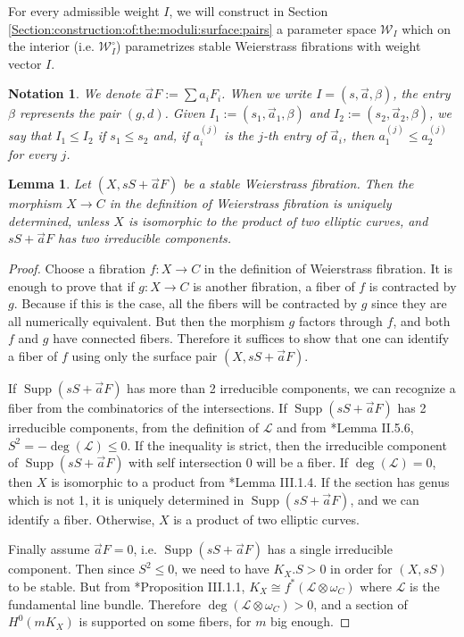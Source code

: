 \documentclass[11pt]{amsart}
\newcommand{\cE}{\mathcal{W}}
\newcommand{\sL}{\mathscr{L}}
\newtheorem{Lemma}[theorem]{Lemma}
\newtheorem{Notation}[theorem]{Notation}
\theoremstyle{definition}
\begin{document}
For every admissible weight $I$, we will construct in Section \ref{Section:construction:of:the:moduli:surface:pairs} a parameter space $\cE_I$ which on the interior (i.e. $\cE_I^\circ$) parametrizes stable Weierstrass fibrations with weight vector $I$.
\begin{Notation}
 We denote $\vec{a}F:=\sum a_i F_i$. When we write $I=(s, \vec{a},\beta)$, the entry $\beta$ represents the pair $(g,d)$. Given $I_1:=(s_1,\vec{a}_1,\beta)$ and $I_2:=(s_2,\vec{a}_2,\beta)$, we say that $I_1 \le I_2$ if $s_1 \le s_2$ and, if $a_i^{(j)}$ is the $j$-th entry of $\vec{a}_i$, then $a_1^{(j)} \le a_2^{(j)}$ for every $j$.
\end{Notation}
\begin{Lemma}\label{Lemma:W:fibration:remembers:the:fibration}Let $(X,sS+\vec{a}F)$ be a stable Weierstrass fibration. Then the morphism $X \to C$ in the definition of Weierstrass fibration is uniquely determined, unless $X$ is isomorphic to the product of two elliptic curves, and $sS+\vec{a}F$ has two irreducible components.  
\end{Lemma}
\begin{proof} Choose a fibration 
$f:X \to C$ in the definition of Weierstrass fibration. It is enough to prove that if $g:X \to C$ is another fibration, a fiber of $f$ is contracted by $g$. Because if this is the case, all the fibers will be contracted by $g$ since they are all numerically equivalent. But then the morphism $g$ factors through $f$, and both $f$ and $g$ have connected fibers. Therefore it suffices to show that one can identify a fiber of $f$ using only the surface pair $(X,sS+\vec{a}F)$.

If $\operatorname{Supp}(sS+\vec{a}F)$ has more than 2 irreducible components,
we can recognize a fiber from the combinatorics of the intersections.
If $\operatorname{Supp}(sS+\vec{a}F)$ has 2 irreducible components, from the definition of $\sL$ and from \cite{Miranda}*{Lemma II.5.6}, $S^2=-\deg(\sL) \le 0$. If the inequality is strict, then the irreducible component of $\operatorname{Supp}(sS+\vec{a}F)$ with self intersection 0 will be a fiber. If $\deg(\sL)=0$, then $X$ is isomorphic to a product from \cite{Miranda}*{Lemma III.1.4}. If the section has genus which is not 1, it is uniquely determined in $\operatorname{Supp}(sS+\vec{a}F)$, and we can identify a fiber. 
Otherwise, $X$ is a product of two elliptic curves.

Finally assume $\vec{a}F=0$, i.e. $\operatorname{Supp}(sS+\vec{a}F)$ has a single irreducible component. Then since $S^2 \le 0$, we need to have $K_X.S >0$ in order for $(X,sS)$ to be stable. But from \cite{Miranda}*{Proposition III.1.1}, $K_X \cong f^*(\sL\otimes \omega_C)$ where $\mathscr{L}$ is the fundamental line bundle. Therefore $\deg(\sL\otimes \omega_C)>0$, and a section of $H^0(m K_X)$ is supported on some fibers, for $m$ big enough. 
\end{proof}
\end{document}
